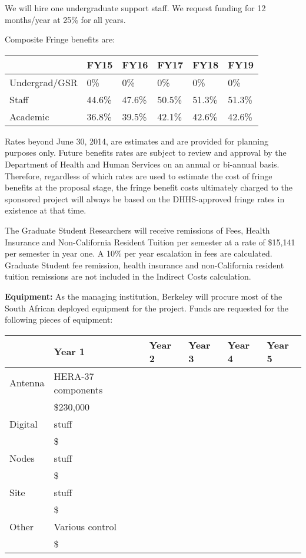 \documentclass[onecolumn,11pt]{aastex}
\begin{document}
We will hire one undergraduate support staff.  We request funding for 12 months/year at 25\% for all years.

Composite Fringe benefits are:
\begin{table}
\begin{tabular}{| l | l | l | l | l | l |}
\hline
            ~ & FY15    & FY16    & FY17   & FY18   & FY19 \\ \hline \hline
Undergrad/GSR &	0\%     & 0\%     & 0\%    & 0\%    &  0\% \\ \hline
Staff         & 44.6\%  & 47.6\%  & 50.5\% & 51.3\% &  51.3\% \\ \hline
Academic      & 36.8\%  & 39.5\%  & 42.1\% & 42.6\% &   42.6\% \\ \hline
\hline
\end{tabular}
\label{tab:fringeBenefits}
\end{table}

Rates beyond June 30, 2014, are estimates and are provided for planning purposes only. Future benefits rates are subject to review and approval by the Department of Health and Human Services on an annual or bi-annual basis. Therefore, regardless of which rates are used to estimate the cost of fringe benefits at the proposal stage, the fringe benefit costs ultimately charged to the sponsored project will always be based on the DHHS-approved fringe rates in existence at that time.

The Graduate Student Researchers will receive remissions of Fees, Health Insurance and Non-California Resident Tuition per semester at a rate of \$15,141 per semester in year one.  A 10\% per year escalation in fees are calculated.  Graduate Student fee remission, health insurance and non-California resident tuition remissions are not included in the Indirect Costs calculation. 

{\bf Equipment:}  As the managing institution, Berkeley will procure most of the South African deployed equipment for the project.  Funds are requested for the following pieces of equipment:

\begin{table}
\begin{tabular}{|l|l|l|l|l|l|}
\hline
        & Year 1 & Year 2 & Year 3 & Year 4 & Year 5 \\ \hline \hline
Antenna & HERA-37 components & & & &\\
        & \$230,000 & & & &\\ \hline
Digital & stuff & & & & \\
        & \$    & & & & \\ \hline
Nodes   & stuff & & & & \\
        & \$    & & & & \\ \hline
Site    & stuff & & & &\\
        & \$    & & & & \\ \hline
Other   & \multicolumn{5}{|l|}{Various control} \\ 
        & \$    & & & & \\ \hline
\end{tabular}
\end{table}
\end{document}
